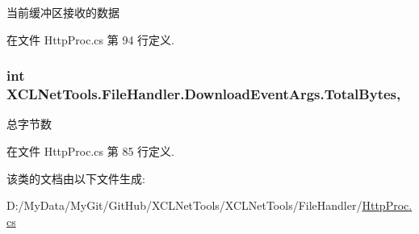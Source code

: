 当前缓冲区接收的数据 



在文件 Http\-Proc.\-cs 第 94 行定义.

\hypertarget{class_x_c_l_net_tools_1_1_file_handler_1_1_download_event_args_a344cbcca5a213a50ecd25b90340be816}{
\subsubsection[{Total\-Bytes}]{\setlength{\rightskip}{0pt plus 5cm}int X\-C\-L\-Net\-Tools.\-File\-Handler.\-Download\-Event\-Args.\-Total\-Bytes\hspace{0.3cm}{\ttfamily [get]}, {\ttfamily [set]}}}\label{class_x_c_l_net_tools_1_1_file_handler_1_1_download_event_args_a344cbcca5a213a50ecd25b90340be816}


总字节数 



在文件 Http\-Proc.\-cs 第 85 行定义.



该类的文档由以下文件生成\-:\begin{DoxyCompactItemize}
\item 
D\-:/\-My\-Data/\-My\-Git/\-Git\-Hub/\-X\-C\-L\-Net\-Tools/\-X\-C\-L\-Net\-Tools/\-File\-Handler/\hyperlink{_http_proc_8cs}{Http\-Proc.\-cs}\end{DoxyCompactItemize}
